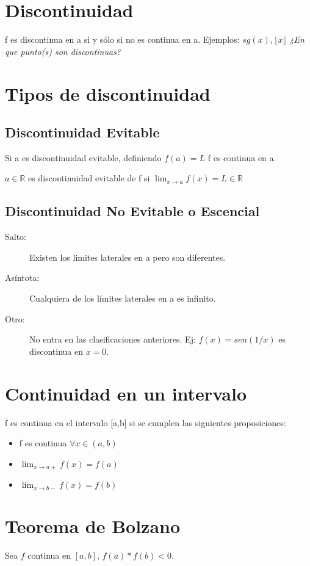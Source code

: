 \documentclass{report}
\begin{document}
	\section{Discontinuidad}
		f es discontinua en a si y sólo si no es continua en a. Ejemplos: $sg(x), \lfloor x \rfloor$ \textit{¿En que punto(s) son discontinuas?}
		
	\section{Tipos de discontinuidad}
		\subsection{Discontinuidad Evitable}
			Si a es discontinuidad evitable, definiendo $f(a)=L$ f es continua en a. 
			
			$a \in \mathbb{R}$ es discontinuidad evitable de f si $\lim_{x \to a}f(x)=L \in \mathbb{R}$
			
		\subsection{Discontinuidad No Evitable o Escencial}
			\begin{description}
				\item[Salto:] Existen los limites laterales en a pero son diferentes.
				\item[Asíntota:] Cualquiera de los límites laterales en a es infinito.
				\item[Otro:] No entra en las clasificaciones anteriores. Ej: $f(x)=sen(1/x)$ es discontinua en $x=0$.
			\end{description}
		
	\section{Continuidad en un intervalo}
		f es continua en el intervalo [a,b] si se cumplen las siguientes proposiciones:
		
		\begin{itemize}
			\item f es continua $\forall x \in (a,b)$
			\item $\lim_{x \to a+}f(x) = f(a)$
			\item $\lim_{x \to b-}f(x) = f(b)$
		\end{itemize}
	
	\section{Teorema de Bolzano}
		Sea $f$ continua en $[a,b]$, $f(a)*f(b) < 0$.
		
\end{document}
